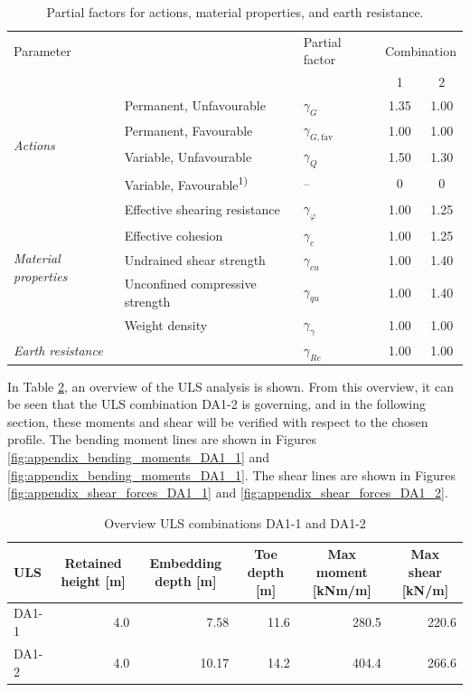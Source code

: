 \begin{table}[H]
\centering
\small
\setlength{\tabcolsep}{8pt}
\renewcommand{\arraystretch}{1.2}
\begin{tabular}{@{}l l l c c@{}}
\toprule
\multicolumn{1}{l}{Parameter} & 
\multicolumn{1}{l}{ } & 
\multicolumn{1}{l}{Partial factor} & 
\multicolumn{2}{c}{Combination}\\
\cmidrule(lr){4-5}
 & & & 1 & 2 \\
\midrule
\multirow{4}{*}{\textit{Actions}} 
 & Permanent, Unfavourable & $\gamma_G$ & 1.35 & 1.00 \\
 & Permanent, Favourable   & $\gamma_{G,\mathrm{fav}}$ & 1.00 & 1.00 \\
 & Variable, Unfavourable  & $\gamma_Q$ & 1.50 & 1.30 \\
 & Variable, Favourable\textsuperscript{1)} & -- & 0 & 0 \\
\midrule
\multirow{5}{*}{\textit{Material properties}} 
 & Effective shearing resistance & $\gamma_\varphi$ & 1.00 & 1.25 \\
 & Effective cohesion & $\gamma_c$ & 1.00 & 1.25 \\
 & Undrained shear strength & $\gamma_{cu}$ & 1.00 & 1.40 \\
 & Unconfined compressive strength & $\gamma_{qu}$ & 1.00 & 1.40 \\
 & Weight density & $\gamma_\gamma$ & 1.00 & 1.00 \\
\midrule
\textit{Earth resistance} & & $\gamma_{Re}$ & 1.00 & 1.00 \\
\bottomrule
\end{tabular}
\caption{Partial factors for actions, material properties, and earth resistance.}
\label{tab:partial_factors}
\end{table}

In Table \ref{tab:uls_summary}, an overview of the ULS analysis is shown. From this overview, it can be seen that the ULS combination DA1-2 is governing, and in the following section, these moments and shear will be verified with respect to the chosen profile. The bending moment lines are shown in Figures \ref{fig:appendix_bending_moments_DA1_1} and \ref{fig:appendix_bending_moments_DA1_1}. The shear lines are shown in Figures \ref{fig:appendix_shear_forces_DA1_1} and \ref{fig:appendix_shear_forces_DA1_2}.

\begin{table}[H]
  \centering
  \caption{Overview ULS combinations DA1-1 and DA1-2}
  \label{tab:uls_summary}
  \small
  \setlength{\tabcolsep}{8pt}
  \renewcommand{\arraystretch}{1.15}
  \begin{tabular}{@{}l r r r r r@{}}
    \toprule
    ULS & \multicolumn{1}{c}{Retained height [m]} & \multicolumn{1}{c}{Embedding depth [m]} & \multicolumn{1}{c}{Toe depth [m]} & \multicolumn{1}{c}{Max moment [kNm/m]} & \multicolumn{1}{c}{Max shear [kN/m]} \\
    \midrule
    DA1-1   & 4.0 & 7.58 & 11.6 & 280.5 & 220.6 \\
    DA1-2  & 4.0 & 10.17 & 14.2 & 404.4 & 266.6 \\
    \bottomrule
  \end{tabular}
\end{table}

